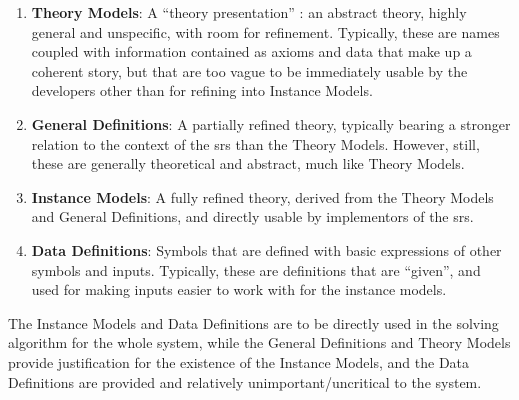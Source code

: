 
\begin{enumerate}

	\item \textbf{Theory Models}: A ``theory presentation'' : an
	      abstract theory, highly general and unspecific, with room for
	      refinement. Typically, these are names coupled with information
	      contained as axioms and data that make up a coherent story, but
	      that are too vague to be immediately usable by the developers
	      other than for refining into Instance Models.

	\item \textbf{General Definitions}: A partially refined theory, typically
	      bearing a stronger relation to the context of the \acs{srs} than the
	      Theory Models. However, still, these are generally theoretical and
	      abstract, much like Theory Models.

	\item \textbf{Instance Models}: A fully refined theory, derived from the
	      Theory Models and General Definitions, and directly usable by
	      implementors of the \acs{srs}.

	\item \textbf{Data Definitions}: Symbols that are defined with basic
	      expressions of other symbols and inputs. Typically, these are
	      definitions that are ``given'', and used for making inputs easier to
	      work with for the instance models.

\end{enumerate}


The Instance Models and Data Definitions are to be directly used in the solving
algorithm for the whole system, while the General Definitions and Theory Models
provide justification for the existence of the Instance Models, and the Data
Definitions are provided and relatively unimportant/uncritical to the system.

